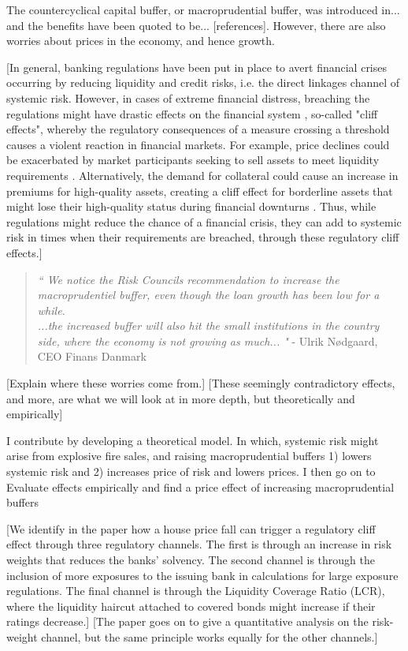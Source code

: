 \documentclass[11pt]{article}
\begin{document}
The countercyclical capital buffer, or macroprudential buffer, was introduced in... and the benefits have been quoted to be... [references]. However, there are also worries about prices in the economy, and hence growth.

[In general, banking regulations have been put in place to avert financial crises occurring by reducing liquidity and credit risks, i.e. the direct linkages channel of systemic risk. However, in cases of extreme financial distress, breaching the regulations might have drastic effects on the financial system \citep{CruzLopez2013}, so-called "cliff effects", whereby the regulatory consequences of a measure crossing a threshold causes a violent reaction in financial markets.  For example, price declines could be exacerbated by market participants seeking to sell assets to meet liquidity requirements \citep{Gorton2009}. Alternatively, the demand for collateral could cause an increase in premiums for high-quality assets, creating a cliff effect for borderline assets that might lose their high-quality status during financial downturns \citep{IMF2012}. Thus, while regulations might reduce the chance of a financial crisis, they can add to systemic risk in times when their requirements are breached, through these regulatory cliff effects.]

\begin{quote}\textit{``
We notice the Risk Councils recommendation to increase the macroprudentiel buffer, even though the loan growth has been low for a while.\\ ...the increased buffer will also hit the small institutions in the country side, where the economy is not growing as much...
"}
- {Ulrik Nødgaard, CEO Finans Danmark}
\end{quote}

[Explain where these worries come from.] [These seemingly contradictory effects, and more, are what we will look at in more depth, but theoretically and empirically]

I contribute by developing a theoretical model. In which, systemic risk might arise from explosive fire sales, and raising macroprudential buffers 1) lowers systemic risk and 2) increases price of risk and lowers prices. I then go on to Evaluate effects empirically and find a price effect of increasing macroprudential buffers


[We identify in the paper how a house price fall can trigger a regulatory cliff effect through three regulatory channels. The first is through an increase in risk weights that reduces the banks' solvency. The second channel is through the inclusion of more exposures to the issuing bank in calculations for large exposure regulations. The final channel is through the Liquidity Coverage Ratio (LCR), where the liquidity haircut attached to covered bonds might increase if their ratings decrease.] [The paper goes on to give a quantitative analysis on the risk-weight channel, but the same principle works equally for the other channels.]
\end{document}
